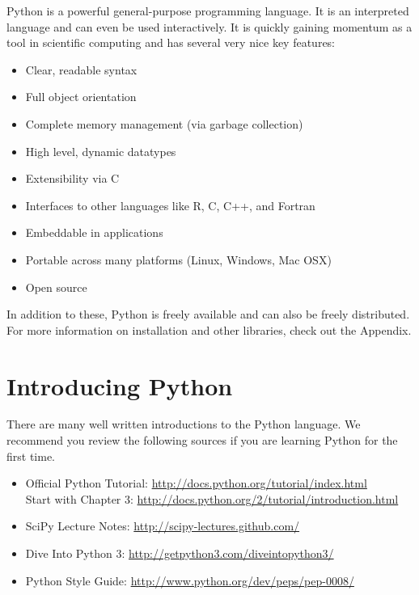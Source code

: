 \label{lab:Essential_Python}

Python is a powerful general-purpose programming language. It is an interpreted
language and can even be used interactively. 
It is quickly gaining momentum as a tool in scientific computing and has several very
nice key features:
\begin{itemize}
\item Clear, readable syntax
\item Full object orientation
\item Complete memory management (via garbage collection)
\item High level, dynamic datatypes
\item Extensibility via C
\item Interfaces to other languages like R, C, C++, and Fortran
\item Embeddable in applications
\item Portable across many platforms (Linux, Windows, Mac OSX)
\item Open source

\end{itemize}
In addition to these, Python is freely available and can also be freely distributed.
For more information on installation and other libraries, check out the Appendix.

\section*{Introducing Python}
There are many well written introductions to the Python language.
We recommend you review the following sources if you are learning Python for the
first time.

\begin{itemize}
\item Official Python Tutorial: \url{http://docs.python.org/tutorial/index.html} \\
      Start with Chapter 3: \url{http://docs.python.org/2/tutorial/introduction.html}
\item SciPy Lecture Notes: \url{http://scipy-lectures.github.com/}
\item Dive Into Python 3: \url{http://getpython3.com/diveintopython3/}
\item Python Style Guide: \url{http://www.python.org/dev/peps/pep-0008/}
\end{itemize}

